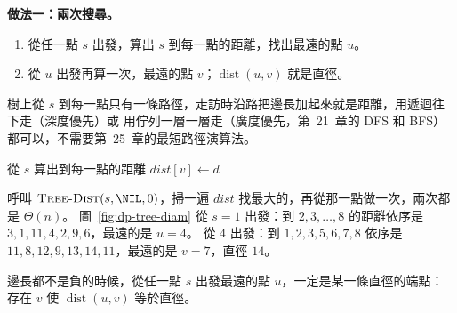 \textbf{做法一：兩次搜尋。}
\begin{enumerate}
\item 從任一點 $s$ 出發，算出 $s$ 到每一點的距離，找出最遠的點 $u$。
\item 從 $u$ 出發再算一次，最遠的點 $v$；$\operatorname{dist}(u, v)$ 就是直徑。
\end{enumerate}
樹上從 $s$ 到每一點只有一條路徑，走訪時沿路把邊長加起來就是距離，用遞迴往下走（深度優先）或
用佇列一層一層走（廣度優先，第~21~章的 DFS 和 BFS）都可以，不需要第~25~章的最短路徑演算法。

\begin{pseudo}[label=alg:dp-tree-dist]{從 $s$ 算出到每一點的距離}
 
    \State $\mathit{dist}[v] \gets d$
            \State {}
        \EndIf
    \EndFor
\EndProcedure
\end{pseudo}

呼叫 $\proc{Tree-Dist}(s, \NIL, 0)$，掃一遍 $\mathit{dist}$ 找最大的，再從那一點做一次，兩次都
是 $\Theta(n)$。 圖~\ref{fig:dp-tree-diam} 從 $s = 1$ 出發：到 $2, 3, \ldots, 8$ 的距離依序是
$3, 1, 11, 4, 2, 9, 6$，最遠的是 $u = 4$。 從 $4$ 出發：到 $1, 2, 3, 5, 6, 7, 8$ 依序是
$11, 8, 12, 9, 13, 14, 11$，最遠的是 $v = 7$，直徑 $14$。

\begin{theorem}
\label{thm:dp-two-search}
邊長都不是負的時候，從任一點 $s$ 出發最遠的點 $u$，一定是某一條直徑的端點：存在 $v$ 使
$\operatorname{dist}(u, v)$ 等於直徑。
\end{theorem}

